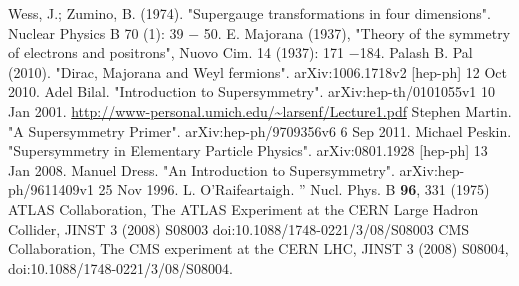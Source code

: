 \documentclass[12pt]{report}
\begin{document}
\begin{thebibliography}{999}
 Wess, J.; Zumino, B. (1974). "Supergauge transformations in four dimensions". Nuclear Physics B 70 (1): 39 $-$ 50.
 E. Majorana (1937), "Theory of the symmetry of electrons and positrons", Nuovo Cim. 14 (1937): 171 $-$184.
 Palash B. Pal (2010). "Dirac, Majorana and Weyl fermions". arXiv:1006.1718v2 [hep-ph] 12 Oct 2010.
 Adel Bilal. "Introduction to Supersymmetry". arXiv:hep-th/0101055v1 10 Jan 2001.
 \url{http://www-personal.umich.edu/~larsenf/Lecture1.pdf}
 Stephen Martin. "A Supersymmetry Primer". arXiv:hep-ph/9709356v6 6 Sep 2011.
 Michael Peskin. "Supersymmetry in Elementary Particle Physics". arXiv:0801.1928 [hep-ph] 13 Jan 2008.
 Manuel Dress. "An Introduction to Supersymmetry". arXiv:hep-ph/9611409v1 25 Nov 1996.
 L. O'Raifeartaigh. '' Nucl. Phys. B \textbf{96}, 331 (1975)
 ATLAS Collaboration, The ATLAS Experiment at the CERN Large Hadron Collider, JINST 3 (2008) S08003 doi:10.1088/1748-0221/3/08/S08003
 CMS Collaboration, The CMS experiment at the CERN LHC, JINST 3 (2008) S08004, doi:10.1088/1748-0221/3/08/S08004.
\end{thebibliography}
\end{document}
